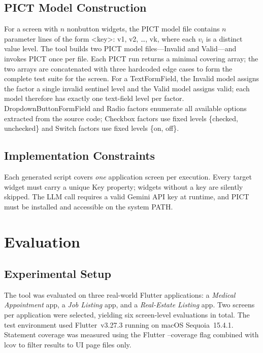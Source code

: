 \documentclass[conference]{IEEEtran}
\renewcommand{\texttt}[1]{\textnormal{#1}}
\begin{document}
\subsection{PICT Model Construction}
For a screen with $n$ nonbutton widgets, the PICT model file contains
$n$ parameter lines of the form \texttt{<key>: v1, v2, \ldots, vk},
where each $v_i$ is a distinct value level. The tool builds two
PICT model files---Invalid and Valid---and invokes PICT once per file. Each
PICT run returns a minimal covering array; the two arrays are
concatenated with three hardcoded edge cases to form the complete test
suite for the screen. For a \texttt{TextFormField}, the Invalid model assigns
the factor a single \texttt{invalid} sentinel level and the Valid model
assigns \texttt{valid}; each model therefore has exactly one text-field
level per factor. \texttt{Dropdown\allowbreak{}Button\allowbreak{}FormField} and \texttt{Radio}
factors enumerate all available options extracted from the source code;
\texttt{Checkbox} factors use fixed levels \{checked, unchecked\} and
\texttt{Switch} factors use fixed levels \{on, off\}.

\subsection{Implementation Constraints}
Each generated script covers \emph{one} application screen per
execution. Every target widget must carry a unique \texttt{Key}
property; widgets without a key are silently skipped. The LLM call
requires a valid Gemini API key at runtime, and PICT must be installed
and accessible on the system \texttt{PATH}.

\section{Evaluation}

\subsection{Experimental Setup}
The tool was evaluated on three real-world Flutter applications: a
\textit{Medical Appointment} app, a \textit{Job Listing} app, and a
\textit{Real-Estate Listing} app. Two screens per application were
selected, yielding six screen-level evaluations in total. The test
environment used Flutter~v3.27.3 running on macOS Sequoia~15.4.1.
Statement coverage was measured using the Flutter \texttt{--coverage} flag
combined with \texttt{lcov} to filter results to UI page files only.
\end{document}
